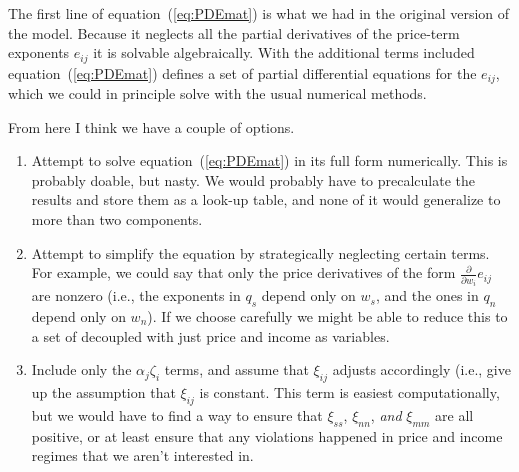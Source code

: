 \documentclass[11pt]{article}
\begin{document}
The first line of equation~(\ref{eq:PDEmat}) is what we had in the
original version of the model.  Because it neglects all the partial
derivatives of the price-term exponents $e_{ij}$ it is solvable
algebraically.  With the additional terms included
equation~(\ref{eq:PDEmat}) defines a set of partial differential
equations for the $e_{ij}$, which we could in principle solve with the
usual numerical methods.

From here I think we have a couple of options.
\begin{enumerate}
\item Attempt to solve equation~(\ref{eq:PDEmat}) in its full form
  numerically.  This is probably doable, but nasty.  We would probably
  have to precalculate the results and store them as a look-up table,
  and none of it would generalize to more than two components.
\item Attempt to simplify the equation by strategically neglecting
  certain terms.  For example, we could say that only the price
  derivatives of the form $\frac{\partial}{\partial w_i} e_{ij}$ are
  nonzero (i.e., the exponents in $q_s$ depend only on $w_s$, and the
  ones in $q_n$ depend only on $w_n$).  If we choose carefully we
  might be able to reduce this to a set of decoupled with just price
  and income as variables.
\item Include only the $\alpha_j \zeta_i$ terms, and assume that
  $\xi_{ij}$ adjusts accordingly (i.e., give up the assumption that
  $\xi_{ij}$ is constant.  This term is easiest computationally, but
  we would have to find a way to ensure that $\xi_{ss}$, $\xi_{nn}$,
  \emph{and} $\xi_{mm}$ are all positive, or at least ensure that any
  violations happened in price and income regimes that we aren't
  interested in.
\end{enumerate}
\end{document}
